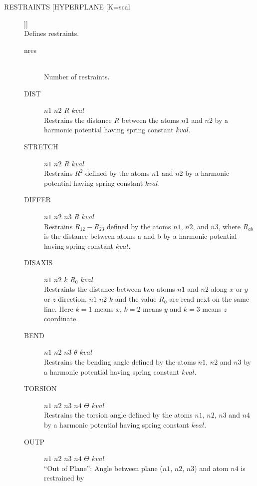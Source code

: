 \documentclass[twoside,10pt,titlepage,a4paper]{article}
\begin{document}
\begin{description}
           \item[RESTRAINTS [HYPERPLANE [K=scal]]] \hfill \\
             Defines restraints. 
             \begin{description}
             \item[nres] \hfill\\
               Number of restraints.
             \item[DIST]  $n1$ $n2$ $R$ $kval$ \hfill\\
               Restrains the distance $R$ between the atoms $n1$ and $n2$ by
               a harmonic potential having spring constant $kval$.
             \item[STRETCH]  $n1$ $n2$ $R$ $kval$ \hfill\\
               Restrains $R^2$ defined by the atoms $n1$ and $n2$ by
               a harmonic potential having spring constant $kval$.
             \item[DIFFER]  $n1$ $n2$ $n3$ $R$ $kval$ \hfill\\
               Restrains $R_{12}-R_{23}$ defined by the atoms $n1$, $n2$, and $n3$,
               where $R_{ab}$ is the distance between atoms a and b by
               a harmonic potential having spring constant $kval$.
              \item[DISAXIS] $n1$ $n2$ $k$ $R_0$ $kval$ \hfill\\ 
               Restraints the distance between two atoms $n1$ and $n2$ along $x$ or $y$ or 
               $z$ direction. $n1$ $n2$ $k$ and the value $R_0$ are read next on the same line.
               Here $k=1$ means $x$, $k=2$ means $y$ and $k=3$ means $z$ coordinate. 
             \item[BEND]  $n1$ $n2$ $n3$ $\theta$ $kval$ \hfill\\
               Restrains the bending angle defined by the atoms
               $n1$, $n2$ and $n3$ by a harmonic potential having spring constant $kval$.
             \item[TORSION]  $n1$ $n2$ $n3$ $n4$ $\Theta$ $kval$ \hfill\\
               Restrains the torsion angle defined by the atoms
               $n1$, $n2$, $n3$ and $n4$ by a harmonic potential having spring constant $kval$.
             \item[OUTP]  $n1$ $n2$ $n3$ $n4$ $\Theta$ $kval$ \hfill\\
               ``Out of Plane''; Angle between plane
               ($n1$, $n2$, $n3$) and atom $n4$ is restrained by

\end{description}
\end{description}
\end{document}
